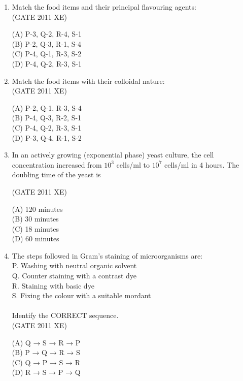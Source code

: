 \documentclass[journal,12pt,onecolumn]{IEEEtran}
\begin{document}
\begin{enumerate}
\item Match the food items and their principal flavouring agents:\\




\hfill{(GATE 2011 XE)} \\
\begin{multicols}{2}
(A) P-3, Q-2, R-4, S-1 \\
(B) P-2, Q-3, R-1, S-4 \\
(C) P-4, Q-1, R-3, S-2 \\
(D) P-4, Q-2, R-3, S-1
\end{multicols}

\item Match the food items with their colloidal nature:\\




\hfill{(GATE 2011 XE)} \\
\begin{multicols}{2}
(A) P-2, Q-1, R-3, S-4 \\
(B) P-4, Q-3, R-2, S-1 \\
(C) P-4, Q-2, R-3, S-1 \\
(D) P-3, Q-4, R-1, S-2
\end{multicols}

\newpage

\item In an actively growing (exponential phase) yeast culture, the cell concentration increased from $10^3$ cells/ml to $10^7$ cells/ml in 4 hours. The doubling time of the yeast is

\hfill{(GATE 2011 XE)} \\
\begin{multicols}{2}
(A) 120 minutes \\
(B) 30 minutes \\
(C) 18 minutes \\
(D) 60 minutes
\end{multicols}

\item The steps followed in Gram's staining of microorganisms are: \\
P. Washing with neutral organic solvent \\
Q. Counter staining with a contrast dye \\
R. Staining with basic dye \\
S. Fixing the colour with a suitable mordant \\ \\
Identify the CORRECT sequence. \\
\hfill{(GATE 2011 XE)} \\
\begin{multicols}{2}
(A) Q → S → R → P \\
(B) P → Q → R → S \\
(C) Q → P → S → R \\
(D) R → S → P → Q
\end{multicols}


\end{enumerate}
\end{document}
